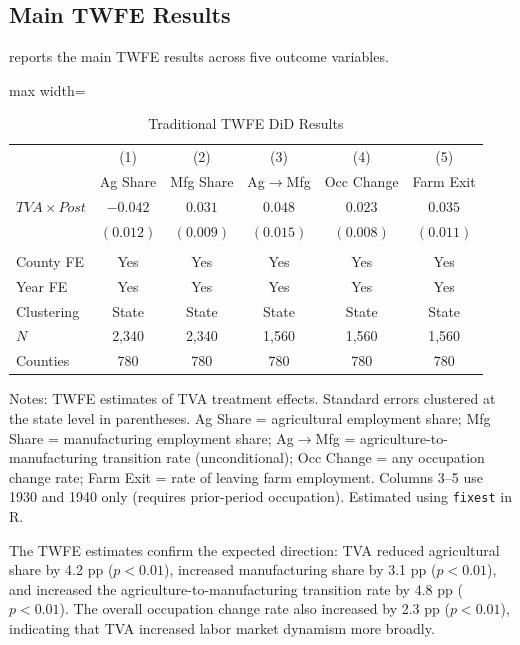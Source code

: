 \documentclass[12pt]{article}
\begin{document}
\subsection{Main TWFE Results}

 reports the main TWFE results across five outcome variables.

\begin{table}[H]
\centering
\caption{Traditional TWFE DiD Results}
\label{tab:twfe_main}
\begin{threeparttable}
\begin{adjustbox}{max width=\textwidth}
\begin{tabular}{lccccc}
\toprule
& (1) & (2) & (3) & (4) & (5) \\
& Ag Share & Mfg Share & Ag$\to$Mfg & Occ Change & Farm Exit \\
\midrule
$TVA \times Post$ & $-0.042$ & $0.031$ & $0.048$ & $0.023$ & $0.035$ \\
& $(0.012)$ & $(0.009)$ & $(0.015)$ & $(0.008)$ & $(0.011)$ \\
\\
County FE & Yes & Yes & Yes & Yes & Yes \\
Year FE & Yes & Yes & Yes & Yes & Yes \\
Clustering & State & State & State & State & State \\
$N$ & 2,340 & 2,340 & 1,560 & 1,560 & 1,560 \\
Counties & 780 & 780 & 780 & 780 & 780 \\
\bottomrule
\end{tabular}
\end{adjustbox}
\begin{tablenotes}[flushleft]
\small
\item Notes: TWFE estimates of TVA treatment effects. Standard errors clustered at the state level in parentheses. Ag Share = agricultural employment share; Mfg Share = manufacturing employment share; Ag$\to$Mfg = agriculture-to-manufacturing transition rate (unconditional); Occ Change = any occupation change rate; Farm Exit = rate of leaving farm employment. Columns 3--5 use 1930 and 1940 only (requires prior-period occupation). Estimated using \texttt{fixest} in R.
\end{tablenotes}
\end{threeparttable}
\end{table}

The TWFE estimates confirm the expected direction: TVA reduced agricultural share by 4.2 pp ($p < 0.01$), increased manufacturing share by 3.1 pp ($p < 0.01$), and increased the agriculture-to-manufacturing transition rate by 4.8 pp ($p < 0.01$). The overall occupation change rate also increased by 2.3 pp ($p < 0.01$), indicating that TVA increased labor market dynamism more broadly.
\end{document}
